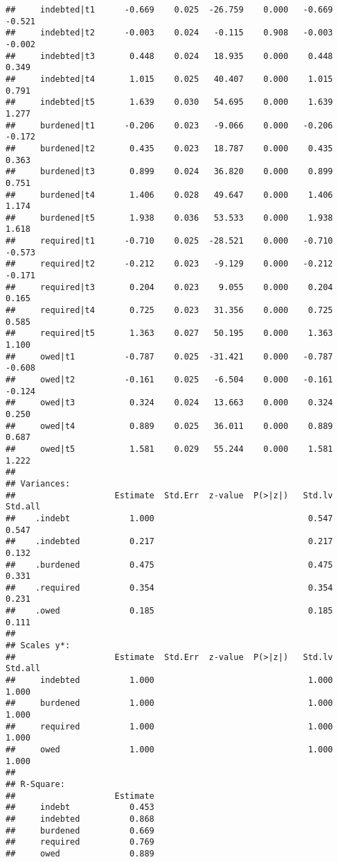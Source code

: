 \documentclass[
]{article}
\begin{document}
\begin{verbatim}
##     indebted|t1      -0.669    0.025  -26.759    0.000   -0.669   -0.521
##     indebted|t2      -0.003    0.024   -0.115    0.908   -0.003   -0.002
##     indebted|t3       0.448    0.024   18.935    0.000    0.448    0.349
##     indebted|t4       1.015    0.025   40.407    0.000    1.015    0.791
##     indebted|t5       1.639    0.030   54.695    0.000    1.639    1.277
##     burdened|t1      -0.206    0.023   -9.066    0.000   -0.206   -0.172
##     burdened|t2       0.435    0.023   18.787    0.000    0.435    0.363
##     burdened|t3       0.899    0.024   36.820    0.000    0.899    0.751
##     burdened|t4       1.406    0.028   49.647    0.000    1.406    1.174
##     burdened|t5       1.938    0.036   53.533    0.000    1.938    1.618
##     required|t1      -0.710    0.025  -28.521    0.000   -0.710   -0.573
##     required|t2      -0.212    0.023   -9.129    0.000   -0.212   -0.171
##     required|t3       0.204    0.023    9.055    0.000    0.204    0.165
##     required|t4       0.725    0.023   31.356    0.000    0.725    0.585
##     required|t5       1.363    0.027   50.195    0.000    1.363    1.100
##     owed|t1          -0.787    0.025  -31.421    0.000   -0.787   -0.608
##     owed|t2          -0.161    0.025   -6.504    0.000   -0.161   -0.124
##     owed|t3           0.324    0.024   13.663    0.000    0.324    0.250
##     owed|t4           0.889    0.025   36.011    0.000    0.889    0.687
##     owed|t5           1.581    0.029   55.244    0.000    1.581    1.222
## 
## Variances:
##                    Estimate  Std.Err  z-value  P(>|z|)   Std.lv  Std.all
##    .indebt            1.000                               0.547    0.547
##    .indebted          0.217                               0.217    0.132
##    .burdened          0.475                               0.475    0.331
##    .required          0.354                               0.354    0.231
##    .owed              0.185                               0.185    0.111
## 
## Scales y*:
##                    Estimate  Std.Err  z-value  P(>|z|)   Std.lv  Std.all
##     indebted          1.000                               1.000    1.000
##     burdened          1.000                               1.000    1.000
##     required          1.000                               1.000    1.000
##     owed              1.000                               1.000    1.000
## 
## R-Square:
##                    Estimate
##     indebt            0.453
##     indebted          0.868
##     burdened          0.669
##     required          0.769
##     owed              0.889
\end{verbatim}
\end{document}
